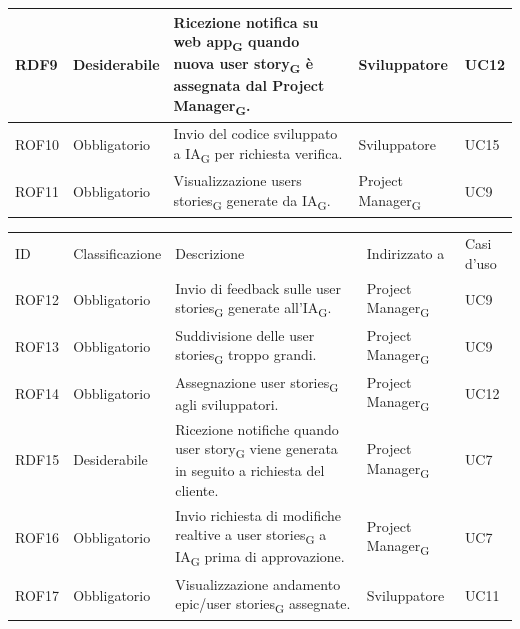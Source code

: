 \documentclass{article}
\begin{document}
\begin{center}
\begin{tabular}{|p{2cm}|p{3cm}|p{6cm}|p{3cm}|p{2cm}|}
RDF9&Desiderabile & Ricezione notifica su web app\textsubscript{G} quando nuova user story\textsubscript{G} è assegnata dal Project Manager\textsubscript{G}.& Sviluppatore & UC12\\
\hline
\rowcolor{LighterBlue}
ROF10&Obbligatorio & Invio del codice sviluppato a IA\textsubscript{G} per richiesta verifica.& Sviluppatore & UC15\\

\hline
\rowcolor{LightBlue}

ROF11&Obbligatorio & Visualizzazione users stories\textsubscript{G} generate da IA\textsubscript{G}.  & Project Manager\textsubscript{G} & UC9\\
\hline


\end{tabular}

    \begin{tabular}{|p{2cm}|p{3cm}|p{6cm}|p{3cm}|p{2cm}|}
    \rowcolor{Blue} 
\hline
ID & Classificazione & Descrizione & Indirizzato a&Casi d'uso  \\ 
\rowcolor{LightBlue}
\hline
ROF12&Obbligatorio & Invio di feedback sulle user stories\textsubscript{G} generate all'IA\textsubscript{G}.& Project Manager\textsubscript{G}&UC9\\
\hline
\rowcolor{LighterBlue}

ROF13&Obbligatorio & Suddivisione delle user stories\textsubscript{G} troppo grandi.  & Project Manager\textsubscript{G}& UC9\\
\hline
\rowcolor{LightBlue}

ROF14&Obbligatorio & Assegnazione user stories\textsubscript{G} agli sviluppatori.& Project Manager\textsubscript{G}& UC12\\
\hline
\rowcolor{LighterBlue}

RDF15&Desiderabile & Ricezione notifiche quando user story\textsubscript{G} viene generata in seguito a richiesta del cliente. & Project Manager\textsubscript{G} & UC7\\
\hline
\rowcolor{LightBlue}

ROF16&Obbligatorio & Invio richiesta di modifiche realtive a user stories\textsubscript{G} a IA\textsubscript{G} prima di approvazione. & Project Manager\textsubscript{G}& UC7\\
\hline
\rowcolor{LighterBlue}

ROF17&Obbligatorio & Visualizzazione andamento epic/user stories\textsubscript{G} assegnate.& Sviluppatore& UC11\\


\end{tabular}
\end{center}
\end{document}
